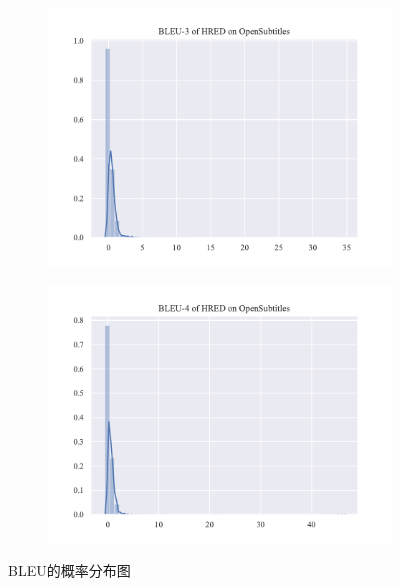 \begin{figure}
\begin{subfigure}{0.5\linewidth}
        \includegraphics[width=\linewidth]{figure/distplot/opensub/hred/bleu_3/plot.pdf}
    \end{subfigure}%
    \begin{subfigure}{0.5\linewidth}
        \centering
        \includegraphics[width=\linewidth]{figure/distplot/opensub/hred/bleu_4/plot.pdf}
    \end{subfigure}
    \centering
    \caption{BLEU的概率分布图}
    \label{fig:BLEU_dist}
\end{figure}